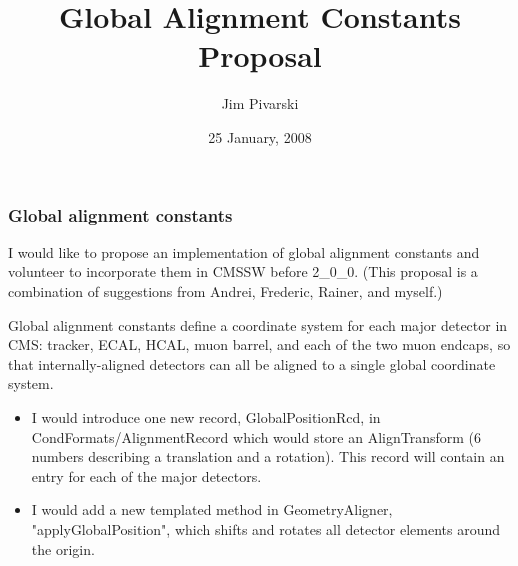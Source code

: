 \documentclass[compress]{beamer}
\title{Global Alignment Constants Proposal}
\author{Jim Pivarski}
\institute{Texas A\&M University}
\date{25 January, 2008}
\begin{document}
\frame{\titlepage}


\begin{frame}
\frametitle{Global alignment constants}

I would like to propose an implementation of global alignment
constants and volunteer to incorporate them in CMSSW before 2\_0\_0.
(This proposal is a combination of suggestions from Andrei, Frederic,
Rainer, and myself.)

\vfill
Global alignment constants define a coordinate system for each major
detector in CMS: tracker, ECAL, HCAL, muon barrel, and each of the two
muon endcaps, so that internally-aligned detectors can all be aligned
to a single global coordinate system.
\end{frame}

\begin{frame}
\begin{itemize}\setlength{\itemsep}{0.5 cm}
\item I would introduce one new record, GlobalPositionRcd, in CondFormats/AlignmentRecord which would store an AlignTransform (6 numbers describing a translation and a rotation).  This record will contain an entry for each of the major detectors.
\item I would add a new templated method in GeometryAligner, "applyGlobalPosition", which shifts and rotates all detector elements around the origin.
\end{itemize}
\end{frame}
\end{document}
